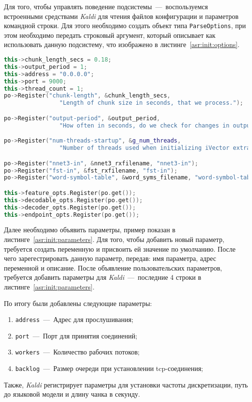 Для того, чтобы управлять поведение подсистемы~---~воспользуемся встроенными
средствами \textit{Kaldi} для чтения файлов конфигурации и параметров командной
строки. Для этого необходимо создать объект типа \texttt{ParseOptions}, при этом
необходимо передать строковый аргумент, который описывает как использовать данную
подсистему, что изображено в листинге~\ref{asr:init:options}.

\begin{lstlisting}[caption={Пример объявление параметров},label={asr:init:parameters},language=C++]
this->chunk_length_secs = 0.18;
this->output_period = 1;
this->address = "0.0.0.0";
this->port = 9000;
this->thread_count = 1;
po->Register("chunk-length", &chunk_length_secs,
                "Length of chunk size in seconds, that we process.");

po->Register("output-period", &output_period,
                "How often in seconds, do we check for changes in output.");

po->Register("num-threads-startup", &g_num_threads,
                "Number of threads used when initializing iVector extractor.");

po->Register("nnet3-in", &nnet3_rxfilename, "nnet3-in");
po->Register("fst-in", &fst_rxfilename, "fst-in");
po->Register("word-symbol-table", &word_syms_filename, "word-symbol-table");

this->feature_opts.Register(po.get());
this->decodable_opts.Register(po.get());
this->decoder_opts.Register(po.get());
this->endpoint_opts.Register(po.get());

\end{lstlisting}

Далее необходимо объявить параметры, пример показан в листинге~\ref{asr:init:parameters}.
Для того, чтобы добавить новый параметр, требуется создать переменную и присвоить ей
значение по умолчанию. После чего зарегестрировать данную параметр, передав:
имя параметра, адрес переменной и описание. После объявление пользовательских
параметров, требуется добавить параметры для \textit{Kaldi}~---~последние 4 строки в
листинге~\ref{asr:init:parameters}.

По итогу были добавлены следующие параметры:
\begin{enumerate}
    \item \texttt{address}~---~Адрес для прослушивания;
    \item \texttt{port}~---~Порт для принятия соединений;
    \item \texttt{workers}~---~Количество рабочих потоков;
    \item \texttt{backlog}~---~Размер очереди при установлении tcp-соединения;
\end{enumerate}
Также, \textit{Kaldi} регистрирует параметры для установки частоты дискретизации,
путь до языковой модели и длину чанка в секунду.

